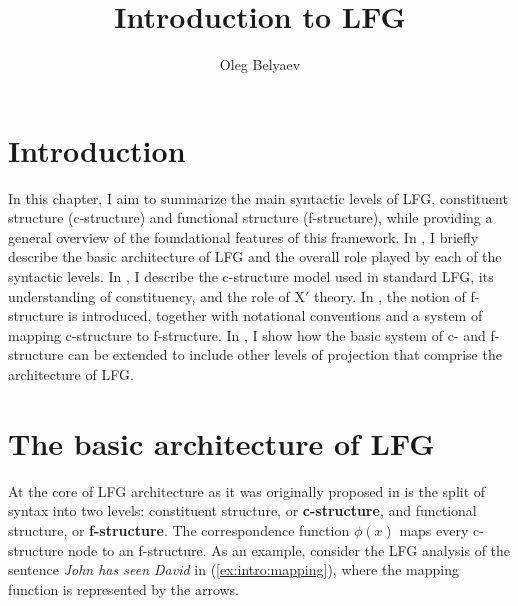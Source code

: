 \documentclass[output=paper]{langscibook}
\title{Introduction to LFG}
\author{Oleg Belyaev\affiliation{Lomonosov Moscow State University, Institute of Linguistics of the Russian Academy of Sciences, and Pushkin State Russian Language Institute}}
\begin{document}
\maketitle
\label{chap:Intro}

\section{Introduction}
 
In this chapter, I aim to summarize the main syntactic levels of LFG, constituent structure (c-structure) and functional structure (f-structure), while providing a general overview of the foundational features of this framework. In , I briefly describe the basic architecture of LFG and the overall role played by each of the syntactic levels. In , I describe the c-structure model used in standard LFG, its understanding of constituency, and the role of X$'$ theory. In , the notion of f-structure is introduced, together with notational conventions and a system of mapping c-structure to f-structure. In , I show how the basic system of c- and f-structure can be extended to include other levels of projection that comprise the architecture of LFG.
 
 \section{The basic architecture of LFG\label{sect:intro:basic}}
 
 At the core of LFG architecture as it was originally proposed in \textcite{kaplanbresnan82} is the split of syntax into two levels: constituent structure, or \textbf{c-structure}, and functional structure, or \textbf{f-structure}. The correspondence function $\phi(x)$ maps every c-structure node to an f-structure. As an example, consider the LFG analysis of the sentence \textit{John has seen David} in (\ref{ex:intro:mapping}), where the mapping function is represented by the arrows.
 
\end{document}
